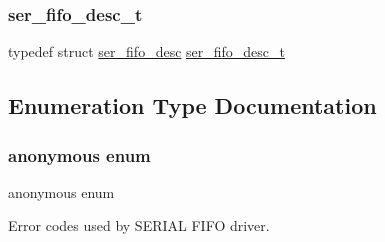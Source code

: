 \subsubsection{\texorpdfstring{ser\_fifo\_desc\_t}{ser\_fifo\_desc\_t}}
{\footnotesize\ttfamily typedef struct \mbox{\hyperlink{structser__fifo__desc}{ser\+\_\+fifo\+\_\+desc}} \mbox{\hyperlink{group__fifo__group_gab18c001ea5c010cc8dfdedb3525f5013}{ser\+\_\+fifo\+\_\+desc\+\_\+t}}}



\subsection{Enumeration Type Documentation}
\mbox{\label{group__fifo__group_gab6753158b7ebbc2bd6601f7f9a02d857}} 
\subsubsection{\texorpdfstring{anonymous enum}{anonymous enum}}
{\footnotesize\ttfamily anonymous enum}



Error codes used by S\+E\+R\+I\+AL F\+I\+FO driver. 

